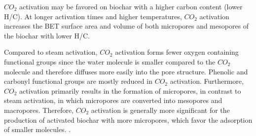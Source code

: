 \vspace{0.3em}


\vspace{0.3em}

$CO_2$ activation may be favored on biochar with a higher carbon content (lower H/C). At longer activation times and higher temperatures, $CO_2$ activation increases the BET surface area and volume of both micropores and mesopores of the biochar with lower H/C. 

\vspace{0.3em}

Compared to steam activation, $CO_2$ activation forms fewer oxygen containing functional groups since the water molecule is smaller compared to the $CO_2$ molecule and therefore diffuses more easily into the pore structure. Phenolic and carbonyl functional groups are mostly reduced in $CO_2$ activation. Furthermore, $CO_2$ activation primarily results in the formation of micropores, in contrast to steam activation, in which micropores are converted into mesopores and macropores. Therefore, $CO_2$ activation is generally more significant for the production of activated biochar with more micropores, which favor the adsorption of smaller molecules. \cite{Sajjadi2019}.      


